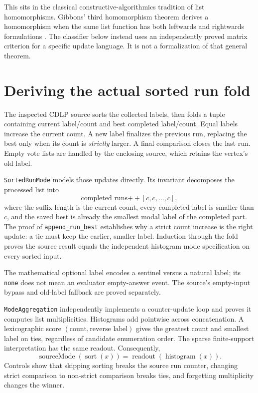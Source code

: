 \documentclass[11pt,a4paper]{article}
\newcommand{\code}[1]{\nolinkurl{#1}}
\begin{document}
This sits in the classical constructive-algorithmics tradition of list
homomorphisms. Gibbons' third homomorphism theorem derives a homomorphism when
the same list function has both leftwards and rightwards formulations
\cite{gibbons}. The classifier below instead uses an independently proved
matrix criterion for a specific update language. It is not a formalization
of that general theorem.

\section{Deriving the actual sorted run fold}

The inspected CDLP source sorts the collected labels, then folds a tuple
containing current label/count and best completed label/count. Equal labels
increase the current count. A new label finalizes the previous run, replacing
the best only when its count is \emph{strictly} larger. A final comparison
closes the last run. Empty vote lists are handled by the enclosing source,
which retains the vertex's old label.

\code{SortedRunMode} models those updates directly. Its invariant decomposes
the processed list into
\[
 \text{completed runs}\mathbin{+\!+}[c,c,\ldots,c],
\]
where the suffix length is the current count, every completed label is smaller
than $c$, and the saved best is already the smallest modal label of the
completed part. The proof of \code{append_run_best} establishes why a strict
count increase is the right update: a tie must keep the earlier, smaller label.
Induction through the fold proves the source result equals the independent
histogram mode specification on every sorted input.

The mathematical optional label encodes a sentinel versus a natural label;
its \code{none} does not mean an evaluator empty-answer event. The source's
empty-input bypass and old-label fallback are proved separately.

\code{ModeAggregation} independently implements a counter-update loop and
proves it computes list multiplicities. Histograms add pointwise across
concatenation. A lexicographic score $(\text{count},\text{reverse label})$
gives the greatest count and smallest label on ties, regardless of candidate
enumeration order. The sparse finite-support interpretation has the same
readout. Consequently,
\[
 \operatorname{sourceMode}(\operatorname{sort}(x))
   =\operatorname{readout}(\operatorname{histogram}(x)).
\]
Controls show that skipping sorting breaks the source run counter, changing
strict comparison to non-strict comparison breaks ties, and forgetting
multiplicity changes the winner.
\end{document}
